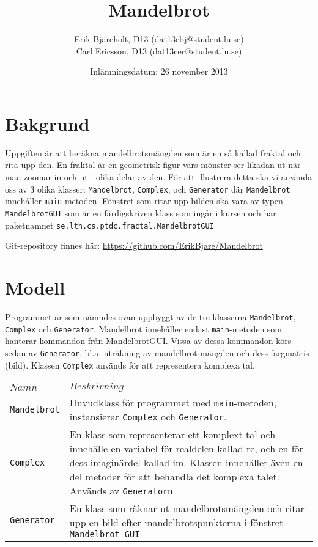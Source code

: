 \documentclass[a4paper]{article}
\title{Mandelbrot}
\author{Erik Bjäreholt, D13 (dat13ebj@student.lu.se)\\Carl Ericsson, D13 (dat13cer@student.lu.se)}
\date{Inlämningsdatum: 26 november 2013}        %
\newcommand{\code}[1]{\texttt{#1}}
\begin{document}

\begin{titlepage}
\maketitle
\end{titlepage}

\section{Bakgrund} 
Uppgiften är att beräkna mandelbrotsmängden som är en så kallad fraktal och rita upp den. En fraktal är en geometrisk figur vars mönster ser likadan ut när man zoomar in och ut i olika delar av den. För att illustrera detta ska vi använda oss av 3 olika klasser: \code{Mandelbrot}, \code{Complex}, och \code{Generator} där \code{Mandelbrot} innehåller \code{main}-metoden.
Fönstret som ritar upp bilden ska vara av typen \code{MandelbrotGUI} som är en färdigskriven klass som ingår i kursen och har paketnamnet \code{se.lth.cs.ptdc.fractal.MandelbrotGUI} 

Git-repository finnes här: \url{https://github.com/ErikBjare/Mandelbrot}

\section{Modell}
Programmet är som nämndes ovan uppbyggt av de tre klasserna \code{Mandelbrot}, \code{Complex} och \code{Generator}. Mandelbrot innehåller endast \code{main}-metoden som hanterar kommandon från MandelbrotGUI. Vissa av dessa kommandon körs sedan av \code{Generator}, bl.a. uträkning av mandelbrot-mängden och dess färgmatris (bild). Klassen \code{Complex} används för att representera komplexa tal.\\
 
\begin{tabular}{lp{8cm}}
    $Namn$ & $Beskrivning$\\
      
	\code{Mandelbrot}  &  
    Huvudklass för programmet med \code{main}-metoden, instansierar \code{Complex} och \code{Generator}.\\

	\code{Complex} & 
	En klass som representerar ett komplext tal och innehålle en variabel för realdelen kallad re, och en för dess imaginärdel kallad im. Klassen innehåller även en del metoder för att behandla det komplexa talet. Används av \code{Generatorn}\\

	\code{Generator} &
	En klass som räknar ut mandelbrotsmängden och ritar upp en bild efter mandelbrotspunkterna i fönstret \code{Mandelbrot GUI}\\	  
	      
\end{tabular}\\
\end{document}
